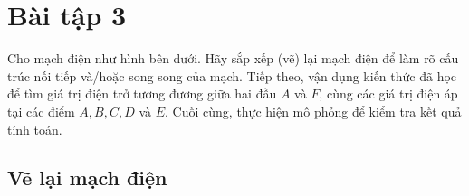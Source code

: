 \section{Bài tập 3}

Cho mạch điện như hình bên dưới. Hãy sắp xếp (vẽ) lại mạch điện để làm rõ cấu trúc nối tiếp và/hoặc song song của mạch. Tiếp theo, vận dụng kiến thức đã học để tìm giá trị điện trở tương đương giữa hai đầu $A$ và $F$, cùng các giá trị điện áp tại các điểm $A, B, C, D$ và $E$. Cuối cùng, thực hiện mô phỏng để kiểm tra kết quả tính toán.


\subsection{Vẽ lại mạch điện}

